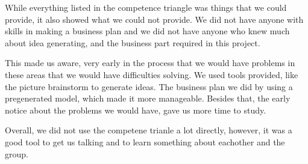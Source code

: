 While everything listed in the competence triangle was things that we could provide, it also showed what we could not provide.
We did not have anyone with skills in making a business plan and we did not have anyone who knew much about idea generating, and the business part required in this project.

This made us aware, very early in the process that we would have problems in these areas that we would have difficulties solving. We used tools provided, like the picture brainstorm to generate ideas. The business plan we did by using a pregenerated model, which made it more manageable. Besides that, the early notice about the problems we would have, gave us more time to study. 

Overall, we did not use the competene trianle a lot directly, however, it was a good tool to get us talking and to learn something about eachother and the group. 
